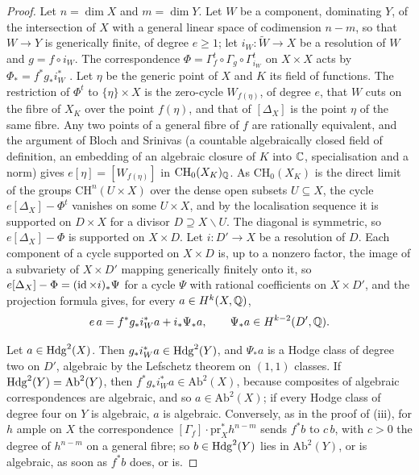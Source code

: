 \begin{proof}
Let $n=\dim X$ and $m=\dim Y$. Let $W$ be a component, dominating $Y$, of the
intersection of $X$ with a general linear space of codimension $n-m$, so that
$W\to Y$ is generically finite, of degree $e\ge1$; let
$i_{W}\colon\widetilde W\to X$ be a resolution of $W$ \cite{Hir64} and
$g=f\circ i_{W}$. The correspondence
$\Phi=\Gamma_{f}^{t}\circ\Gamma_{g}\circ\Gamma_{i_{W}}^{t}$ on $X\times X$
acts by $\Phi_{*}=f^{*}g_{*}i_{W}^{*}$ \cite[Chapter~16]{Ful98}. Let $\eta$ be
the generic point of $X$ and $K$ its field of functions. The restriction of
$\Phi^{t}$ to $\{\eta\}\times X$ is the zero-cycle $W_{f(\eta)}$, of degree
$e$, that $W$ cuts on the fibre of $X_{K}$ over the point $f(\eta)$, and that
of $[\Delta_{X}]$ is the point $\eta$ of the same fibre. Any two points of a
general fibre of $f$ are rationally equivalent, and the argument of Bloch and
Srinivas \cite{BS83} (a countable algebraically closed field of definition,
an embedding of an algebraic closure of $K$ into $\mathbb{C}$, specialisation and a
norm) gives $e[\eta]=[W_{f(\eta)}]$ in $\mathrm{CH}_{0}(X_{K})_{\mathbb{Q}}$. As
$\mathrm{CH}_{0}(X_{K})$ is the direct limit of the groups
$\mathrm{CH}^{n}(U\times X)$ over the dense open subsets $U\subseteq X$, the
cycle $e[\Delta_{X}]-\Phi^{t}$ vanishes on some $U\times X$, and by the
localisation sequence \cite[Chapter~1]{Ful98} it is supported on $D\times X$
for a divisor $D\supseteq X\smallsetminus U$. The diagonal is symmetric, so
$e[\Delta_{X}]-\Phi$ is supported on $X\times D$. Let $i\colon D'\to X$ be a
resolution of $D$. Each component of a cycle supported on $X\times D$ is, up
to a nonzero factor, the image of a subvariety of $X\times D'$ mapping
generically finitely onto it, so $e[\Delta_{X}]-\Phi=(\operatorname{id}\times i)_{*}\Psi$
for a cycle $\Psi$ with rational coefficients on $X\times D'$, and the
projection formula gives, for every $a\in H^{k}(X,\mathbb{Q})$,
\[
  e\,a=f^{*}g_{*}i_{W}^{*}a+i_{*}\Psi_{*}a,\qquad
  \Psi_{*}a\in H^{k-2}(D',\mathbb{Q}).
\]

Let $a\in\mathrm{Hdg}^{2}(X)$. Then $g_{*}i_{W}^{*}a\in\mathrm{Hdg}^{2}(Y)$, and
$\Psi_{*}a$ is a Hodge class of degree two on $D'$, algebraic by the
Lefschetz theorem on $(1,1)$ classes. If $\mathrm{Hdg}^{2}(Y)=\mathrm{Ab}^{2}(Y)$,
then $f^{*}g_{*}i_{W}^{*}a\in\mathrm{Ab}^{2}(X)$, because composites of
algebraic correspondences are algebraic, and so $a\in\mathrm{Ab}^{2}(X)$; if
every Hodge class of degree four on $Y$ is algebraic, $a$ is algebraic.
Conversely, as in the proof of (iii), for $h$ ample on
$X$ the correspondence $[\Gamma_{f}]\cdot\mathrm{pr}_{X}^{*}h^{n-m}$ sends
$f^{*}b$ to $c\,b$, with $c>0$ the degree of $h^{n-m}$ on a general fibre;
so $b\in\mathrm{Hdg}^{2}(Y)$ lies in $\mathrm{Ab}^{2}(Y)$, or is algebraic, as soon
as $f^{*}b$ does, or is.


\end{proof}
